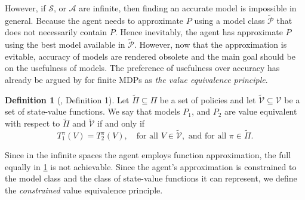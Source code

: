 \documentclass[a4paper]{article}
\theoremstyle{definition}
\newtheorem{definition}{Definition}
\newcommand{\cA}{\mathcal{A}}
\newcommand{\cS}{\mathcal{S}}
\newcommand{\cP}{\mathcal{P}}
\newcommand{\cV}{\mathcal{V}}
\begin{document}
However, if $\cS$, or $\cA$ are infinite, then finding an accurate model is impossible in general. Because the agent needs to approximate $P$ using a model class $\widetilde{\cP}$ that does not necessarily contain $P$. Hence inevitably, the agent has approximate $P$ using the best model available in $\widetilde{\cP}$. However, now that the approximation is evitable, accuracy of models are rendered obsolete and the main goal should be on the usefulness of models. The preference of usefulness over accuracy has already be argued by \citep{grimm2020value} for finite MDPs as \emph{the value equivalence principle}. 
%
\begin{definition}[\cite{grimm2020value}, Definition 1]
    \label{def:val-eq-prin}
    Let $\widetilde{\Pi} \subseteq \Pi$ be a set of policies and let $\widetilde{\cV} \subseteq \mathcal{V}$ be a set of state-value functions. We say that models $P_1$, and $P_2$ are value equivalent with respect to $\widetilde{\Pi}$ and $\widetilde{\cV}$ if and only if
%
    \begin{equation*}
        T^\pi_1(V) = T^\pi_2(V), \quad \text{for all } V \in \widetilde{\cV}, \text{ and for all } \pi \in \widetilde{\Pi}.
    \end{equation*}
\end{definition}
%
Since in the infinite spaces the agent employs function approximation, the full equally in \cref{def:val-eq-prin} is not achievable. Since the agent's approximation is constrained to the model class and the class of state-value functions it can represent, we define the \emph{constrained} value equivalence principle.
\end{document}
